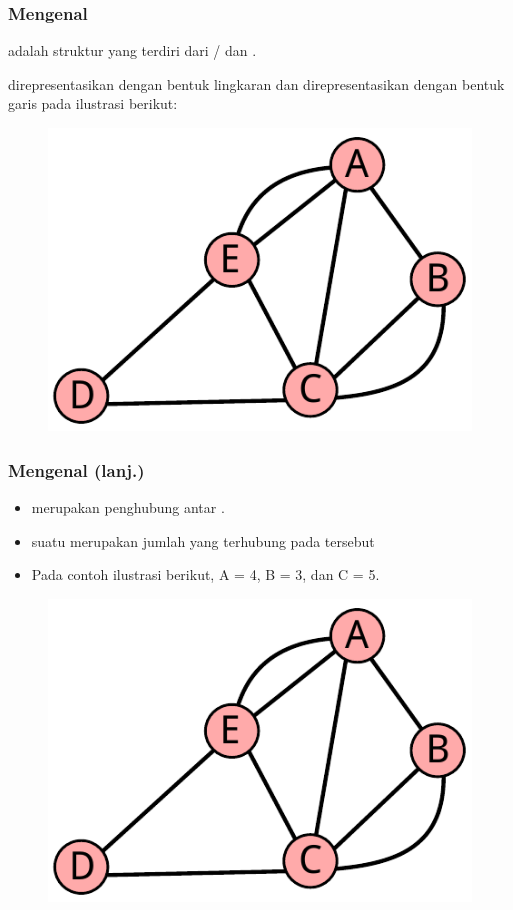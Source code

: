 \begin{frame}
\frametitle{Mengenal \fGraph}
\fGraph adalah struktur yang terdiri dari \alert{\fnode/} dan \alert{\fedge.}\newline

\fNode direpresentasikan dengan bentuk lingkaran dan \fedge direpresentasikan dengan bentuk garis pada ilustrasi berikut:

\begin{figure}
  \centering
  \includegraphics[width=4 cm]{asset/graph.pdf}
\end{figure}
\end{frame}

\begin{frame}
\frametitle{Mengenal \fGraph (lanj.)}
\begin{itemize}
  \item \fEdge merupakan penghubung antar \fnode.
  \item \alert{\fDegree} suatu \fnode merupakan jumlah \fedge yang terhubung pada \fnode tersebut
  \item Pada contoh ilustrasi berikut, \fdegree \fnode A = 4, \fdegree \fnode B = 3, dan \fdegree \fnode C = 5.
\end{itemize}
\begin{figure}
  \centering
  \includegraphics[width=4 cm]{asset/graph.pdf}
\end{figure}
\end{frame}

